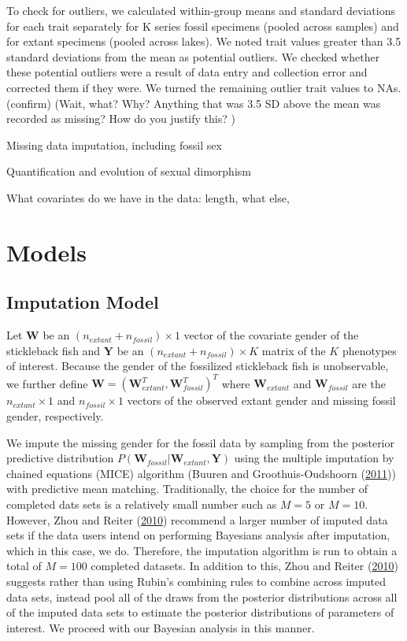 \documentclass[
  12pt,
]{article}
\begin{document}
To check for outliers, we calculated within-group means and standard
deviations for each trait separately for K series fossil specimens
(pooled across samples) and for extant specimens (pooled across lakes).
We noted trait values greater than 3.5 standard deviations from the mean
as potential outliers. We checked whether these potential outliers were
a result of data entry and collection error and corrected them if they
were. We turned the remaining outlier trait values to NAs. (confirm)
(Wait, what? Why? Anything that was 3.5 SD above the mean was recorded
as missing? How do you justify this? )

Missing data imputation, including fossil sex

Quantification and evolution of sexual dimorphism

What covariates do we have in the data: length, what else,

\hypertarget{sec:models}{%
\section{Models}\label{sec:models}}

\hypertarget{imputation-model}{%
\subsection{Imputation Model}\label{imputation-model}}

Let \(\boldsymbol{W}\) be an \((n_{extant} + n_{fossil}) \times 1\)
vector of the covariate gender of the stickleback fish and
\(\boldsymbol{Y}\) be an \((n_{extant} + n_{fossil}) \times K\) matrix
of the \(K\) phenotypes of interest. Because the gender of the
fossilized stickleback fish is unobservable, we further define
\(\boldsymbol{W} = (\boldsymbol{W}_{extant}^T,\boldsymbol{W}_{fossil}^T)^T\)
where \(\boldsymbol{W}_{extant}\) and \(\boldsymbol{W}_{fossil}\) are
the \(n_{extant} \times 1\) and \(n_{fossil} \times 1\) vectors of the
observed extant gender and missing fossil gender, respectively.

We impute the missing gender for the fossil data by sampling from the
posterior predictive distribution
\(P(\boldsymbol{W}_{fossil}|\boldsymbol{W}_{extant},\boldsymbol{Y})\)
using the multiple imputation by chained equations (MICE) algorithm
(Buuren and Groothuis-Oudshoorn (\protect\hyperlink{ref-MICE}{2011}))
with predictive mean matching. Traditionally, the choice for the number
of completed dats sets is a relatively small number such as \(M = 5\) or
\(M = 10\). However, Zhou and Reiter
(\protect\hyperlink{ref-ZhouReiter2009}{2010}) recommend a larger number
of imputed data sets if the data users intend on performing Bayesians
analysis after imputation, which in this case, we do. Therefore, the
imputation algorithm is run to obtain a total of \(M = 100\) completed
datasets. In addition to this, Zhou and Reiter
(\protect\hyperlink{ref-ZhouReiter2009}{2010}) suggests rather than
using Rubin's combining rules to combine across imputed data sets,
instead pool all of the draws from the posterior distributions across
all of the imputed data sets to estimate the posterior distributions of
parameters of interest. We proceed with our Bayesian analysis in this
manner.
\end{document}
